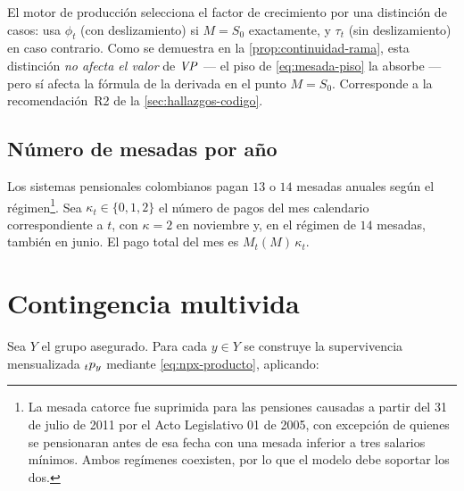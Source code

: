 \begin{remark}
\label{rem:rama-smlv}
El motor de producción selecciona el factor de crecimiento por una distinción de
casos: usa $\phi_t$ (con deslizamiento) si $M=S_0$ exactamente, y $\tau_t$ (sin
deslizamiento) en caso contrario. Como se demuestra en la
\cref{prop:continuidad-rama}, esta distinción \emph{no afecta el valor} de
$\mathit{VP}$ --- el piso de \cref{eq:mesada-piso} la absorbe --- pero sí afecta la
fórmula de la derivada en el punto $M=S_0$. Corresponde a la recomendación~R2 de la
\cref{sec:hallazgos-codigo}.
\end{remark}

\subsection{Número de mesadas por año}

Los sistemas pensionales colombianos pagan $13$ o $14$ mesadas anuales según el
régimen\footnote{La mesada catorce fue suprimida para las pensiones causadas a partir del 31 de julio de 2011 por el Acto Legislativo 01 de 2005, con excepción de quienes se pensionaran antes de esa fecha con una mesada inferior a tres salarios mínimos. Ambos regímenes coexisten, por lo que el modelo debe soportar los dos.}. Sea $\kappa_t\in\{0,1,2\}$ el número de pagos del mes calendario
correspondiente a $t$, con $\kappa=2$ en noviembre y, en el régimen de $14$
mesadas, también en junio. El pago total del mes es $M_t(M)\,\kappa_t$.

\section{Contingencia multivida}

Sea $Y$ el grupo asegurado. Para cada $y\in Y$ se construye la supervivencia
mensualizada ${}_{t}p_{y}$ mediante \cref{eq:npx-producto}, aplicando:

